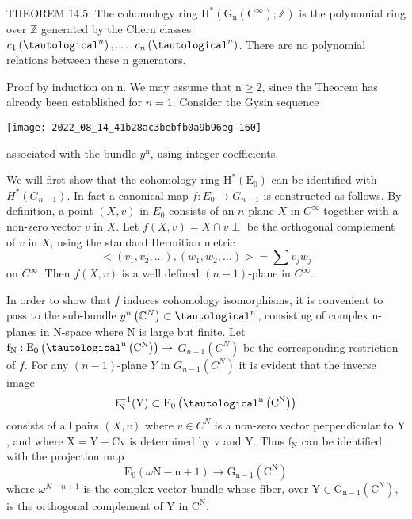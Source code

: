 \documentclass[10pt]{article}
\begin{document}
THEOREM 14.5. The cohomology ring $\mathrm{H}^{*}\left(\mathrm{G}_{\mathrm{n}}\left(\mathrm{C}^{\infty}\right) ; \mathbb{Z}\right)$ is the polynomial ring over $\mathbb{Z}$ generated by the Chern classes $c_{1}\left(\tautological^{n}\right), \ldots, c_{n}\left(\tautological^{n}\right)$. There are no polynomial relations between these $\mathrm{n}$ generators.

Proof by induction on $\mathrm{n}$. We may assume that $\mathrm{n} \geq 2$, since the Theorem has already been established for $n=1$. Consider the Gysin sequence

\texttt{[image: 2022\_08\_14\_41b28ac3bebfb0a9b96eg-160]}

associated with the bundle $y^{\mathrm{n}}$, using integer coefficients.

We will first show that the cohomology ring $\mathrm{H}^{*}\left(\mathrm{E}_{0}\right)$ can be identified with $H^{*}\left(G_{n-1}\right)$. In fact a canonical map $f: E_{0} \rightarrow G_{n-1}$ is constructed as follows. By definition, a point $(X, v)$ in $E_{0}$ consists of an $n$-plane $X$ in $C^{\infty}$ together with a non-zero vector $v$ in $X$. Let $f(X, v)=X \cap v \perp$ be the orthogonal complement of $v$ in $X$, using the standard Hermitian metric
$$
<\left(v_{1}, v_{2}, \ldots\right),\left(w_{1}, w_{2}, \ldots\right)>=\sum v_{j} \bar{w}_{j}
$$
on $C^{\infty}$. Then $f(X, v)$ is a well defined $(n-1)$-plane in $C^{\infty}$.

In order to show that $f$ induces cohomology isomorphisms, it is convenient to pass to the sub-bundle $y^{n}\left(\mathbb{C}^{N}\right) \subset \tautological^{n}$, consisting of complex n-planes in $\mathrm{N}$-space where $\mathrm{N}$ is large but finite. Let $\mathrm{f}_{\mathrm{N}}: \mathrm{E}_{0}\left(\tautological^{\mathrm{n}}\left(\mathrm{C}^{\mathrm{N}}\right)\right) \rightarrow$ $G_{n-1}\left(C^{N}\right)$ be the corresponding restriction of $f$. For any $(n-1)$-plane $Y$ in $G_{n-1}\left(C^{N}\right)$ it is evident that the inverse image
$$
\mathrm{f}_{\mathrm{N}}^{-1}(\mathrm{Y}) \subset \mathrm{E}_{0}\left(\tautological^{\mathrm{n}}\left(\mathrm{C}^{\mathrm{N}}\right)\right)
$$
consists of all pairs $(X, v)$ where $v \in C^{N}$ is a non-zero vector perpendicular to $\mathrm{Y}$, and where $\mathrm{X}=\mathrm{Y}+\mathrm{Cv}$ is determined by $\mathrm{v}$ and $\mathrm{Y}$. Thus $\mathrm{f}_{\mathrm{N}}$ can be identified with the projection map
$$
\mathrm{E}_{0}(\omega \mathrm{N}-\mathrm{n}+1) \rightarrow \mathrm{G}_{\mathrm{n}-1}\left(\mathrm{C}^{\mathrm{N}}\right)
$$
where $\omega^{N-n+1}$ is the complex vector bundle whose fiber, over $\mathrm{Y} \in \mathrm{G}_{\mathrm{n}-1}\left(\mathrm{C}^{\mathrm{N}}\right)$, is the orthogonal complement of $\mathrm{Y}$ in $\mathrm{C}^{\mathrm{N}}$.
\end{document}
